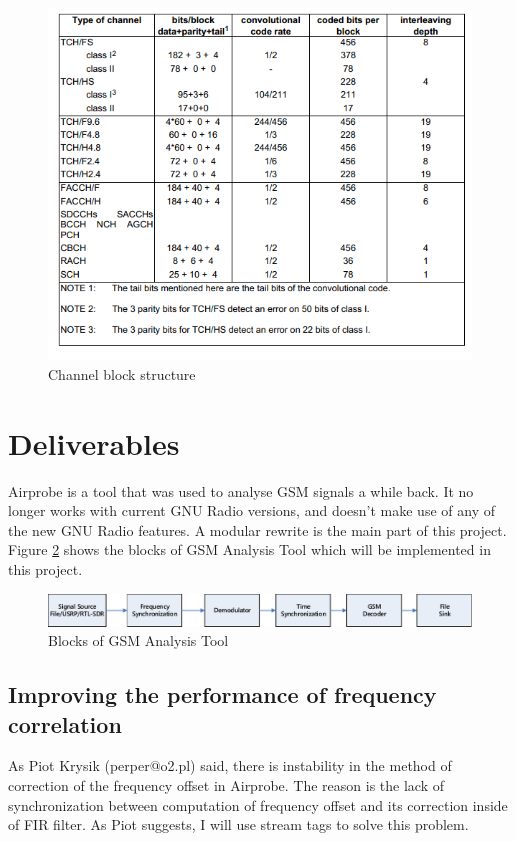 \documentclass[a4paper,12pt,oneside]{article}
\begin{document}
\begin{figure}[h]
\centering\includegraphics[width=5in]{figure/coding.png}
\caption{Channel block structure \label{fig:coding} \cite{etsi199203}}
\end{figure}


\section{Deliverables}
Airprobe is a tool that was used to analyse GSM signals a while back. It no longer works with current GNU Radio versions, and doesn't make use of any of the new GNU Radio features. A modular rewrite is the main part of this project. Figure \ref{fig:3} shows the blocks of GSM Analysis Tool which will be implemented in this project.


\begin{figure}[!h]
\centering\includegraphics[width=5.4in]{figure/flowgraph.pdf}
\caption{Blocks of GSM Analysis Tool \label{fig:3}}
\end{figure}

\subsection{Improving the performance of frequency correlation}

As Piot Krysik (perper@o2.pl) said, there is instability in the method of correction of the frequency offset in Airprobe. The reason is the lack of synchronization between computation of frequency offset and its correction inside of FIR filter. As Piot suggests, I will use stream tags to solve this problem.
\end{document}
